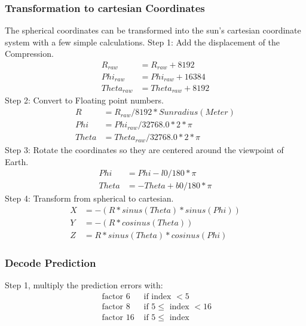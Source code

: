 \subsubsection{Transformation to cartesian Coordinates} \label{anhang:format:euler}
The spherical coordinates can be transformed into the sun's cartesian coordinate system with a few simple calculations.
Step 1: Add the displacement of the Compression. 
\begin{equation}
\begin{split}
	R_{raw} &= R_{raw} + 8192\\
	Phi_{raw} &= Phi_{raw} + 16384\\
	Theta_{raw} &= Theta_{raw} + 8192
\end{split}
\end{equation}
Step 2: Convert to Floating point numbers.
\begin{equation}
\begin{split}
	R &= R_{raw} / 8192 * Sunradius (Meter)\\
	Phi &= Phi_{raw} / 32768.0 * 2 *\pi\\
	Theta &= Theta_{raw} /32768.0 * 2 *\pi
	\end{split}
\end{equation}
Step 3: Rotate the coordinates so they are centered around the viewpoint of Earth.
\begin{equation}
\begin{split}
	Phi &= Phi - l0 /180 * \pi\\
	Theta &= -Theta + b0 /180 * \pi
	\end{split}
\end{equation}
Step 4: Transform from spherical to cartesian.
\begin{equation}
\begin{split}
	X &= -(R * sinus(Theta) * sinus(Phi))\\
	Y &= -(R * cosinus(Theta))\\
	Z &= R * sinus(Theta) * cosinus(Phi)
	\end{split}
\end{equation}

\subsubsection{Decode Prediction}\label{anhang:format:prediction}
Step 1, multiply the prediction errors with:
\begin{equation}
\begin{split}
	\mbox{ factor }6 & \mbox{ if index } < 5\\
	\mbox{ factor }8 & \mbox{ if } 5 \leq \mbox{ index } < 16\\
	\mbox{ factor }16 & \mbox{ if } 5 \leq \mbox{ index }
\end{split}
\end{equation}

